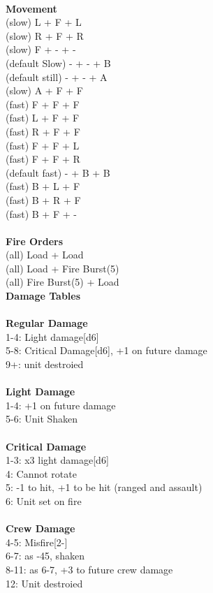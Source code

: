 \ \\ {\bf Movement } \\
(slow) L + F + L \\
(slow) R + F + R \\
(slow) F + - + - \\
(default Slow) - + - + B \\
(default still) - + - + A \\
(slow) A + F + F \\
(fast) F + F + F \\
(fast) L + F + F \\
(fast) R + F + F \\
(fast) F + F + L \\
(fast) F + F + R \\
(default fast) - + B + B \\
(fast) B + L + F \\
(fast) B + R + F \\
(fast) B + F + - \\
\ \\ {\bf Fire Orders } \\
(all) Load + Load \\
(all) Load + Fire Burst(5) \\
(all) Fire Burst(5) + Load \\



{\bf Damage Tables} \\
\ \\ {\bf Regular Damage } \\
1-4: Light damage[d6] \\
5-8: Critical Damage[d6], +1 on future damage \\
9+: unit destroied \\
\ \\ {\bf Light Damage } \\
1-4: +1 on future damage \\
5-6: Unit Shaken \\
\ \\ {\bf Critical Damage  } \\
1-3: x3 light damage[d6] \\
4: Cannot rotate \\
5: -1 to hit, +1 to be hit (ranged and assault) \\
6: Unit set on fire \\
\ \\ {\bf Crew Damage } \\
4-5: Misfire[2-] \\
6-7: as -45, shaken \\
8-11: as 6-7, +3 to future crew damage \\
12: Unit destroied \\


